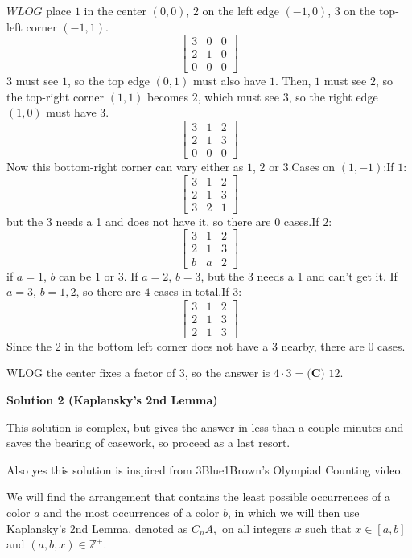 \begin{enumerate}
 $WLOG$ place $1$ in the center $(0,0)$, $2$ on the left edge $(-1,0)$, $3$ on the top-left corner $(-1,1)$.
 \[\begin{bmatrix} 3 & 0 & 0 \\ 2 & 1 & 0 \\ 0 & 0 & 0 \end{bmatrix}\]$3$ must see $1$, so the top edge $(0,1)$ must also have $1$. Then, $1$ must see $2$, so the top-right corner $(1,1)$ becomes $2$, which must see $3$, so the right edge $(1,0)$ must have $3$.
 \[\begin{bmatrix} 3 & 1 & 2 \\ 2 & 1 & 3 \\ 0 & 0 & 0 \end{bmatrix}\]Now this bottom-right corner can vary either as $1$, $2$ or $3$.Cases on $(1,-1)$:If $1$:
 \[\begin{bmatrix} 3 & 1 & 2 \\ 2 & 1 & 3 \\ 3 & 2 & 1 \end{bmatrix}\]but the 3 needs a 1 and does not have it, so there are $0$ cases.If $2$:
 \[\begin{bmatrix} 3 & 1 & 2 \\ 2 & 1 & 3 \\ b & a & 2 \end{bmatrix}\]if $a=1$, $b$ can be $1$ or $3$. If $a=2$, $b=3$, but the 3 needs a 1 and can't get it. If $a=3$, $b=1,2$, so there are $4$ cases in total.If $3$:
 \[\begin{bmatrix} 3 & 1 & 2 \\ 2 & 1 & 3 \\ 2 & 1 & 3 \end{bmatrix}\]Since the 2 in the bottom left corner does not have a 3 nearby, there are $0$ cases.

 WLOG the center fixes a factor of $3$, so the answer is $4\cdot 3=\boxed{\textbf{(C) } 12}$.

 



\textbf{Solution 2 (Kaplansky's 2nd Lemma)}

This solution is complex, but gives the answer in less than a couple minutes and saves the bearing of casework, so proceed as a last resort.

 Also yes this solution is inspired from 3Blue1Brown's Olympiad Counting video.

 We will find the arrangement that contains the least possible occurrences of a color \( a \) and the most occurrences of a color \( b \), in which we will then use Kaplansky's 2nd Lemma, denoted as \( C_n A, \) on all integers \( x \) such that \( x \in [a,b] \) and \( (a,b,x) \in \mathbb{Z}^+ \).


\end{enumerate}
